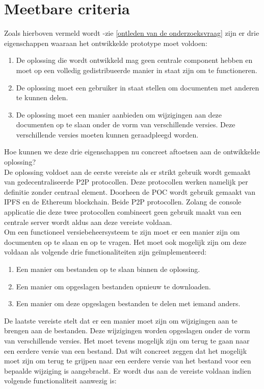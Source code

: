 \section{Meetbare criteria}
Zoals hierboven vermeld wordt -zie \ref{ontleden van de onderzoeksvraag} zijn er drie eigenschappen waaraan het ontwikkelde prototype moet voldoen:

\begin{enumerate}
	\item De oplossing die wordt ontwikkeld mag geen centrale component hebben en moet op een volledig gedistribueerde manier in staat zijn om te functioneren.
	\item De oplossing moet een gebruiker in staat stellen om documenten met anderen te kunnen delen.
	\item De oplossing moet een manier aanbieden om wijzigingen aan deze documenten op te slaan onder de vorm van verschillende versies. Deze verschillende versies moeten kunnen geraadpleegd worden.
\end{enumerate}

Hoe kunnen we deze drie eigenschappen nu concreet aftoetsen aan de ontwikkelde oplossing?\\

De oplossing voldoet aan de eerste vereiste als er strikt gebruik wordt gemaakt van gedecentraliseerde P2P protocollen. Deze protocollen werken namelijk per definitie zonder centraal element. Doorheen de POC wordt gebruik gemaakt van IPFS en de Ethereum blockchain. Beide P2P protocollen. Zolang de console applicatie die deze twee protocollen combineert geen gebruik maakt van een centrale server wordt aldus aan deze vereiste voldaan.\\

Om een functioneel versiebeheersysteem te zijn moet er een manier zijn om documenten op te slaan en op te vragen. Het moet ook mogelijk zijn om deze voldaan als volgende drie functionaliteiten zijn geïmplementeerd:

\begin{enumerate}
\item Een manier om bestanden op te slaan binnen de oplossing.
\item Een manier om opgeslagen bestanden opnieuw te downloaden.
\item Een manier om deze opgeslagen bestanden te delen met iemand anders.
\end{enumerate}

De laatste vereiste stelt dat er een manier moet zijn om wijzigingen aan te brengen aan de bestanden. Deze wijzigingen worden opgeslagen onder de vorm van verschillende versies. Het moet tevens mogelijk zijn om terug te gaan naar een eerdere versie van een bestand. Dat wilt concreet zeggen dat het mogelijk moet zijn om terug te grijpen naar een eerdere versie van het bestand voor een bepaalde wijziging is aangebracht. Er wordt dus aan de vereiste voldaan indien volgende functionaliteit aanwezig is:

